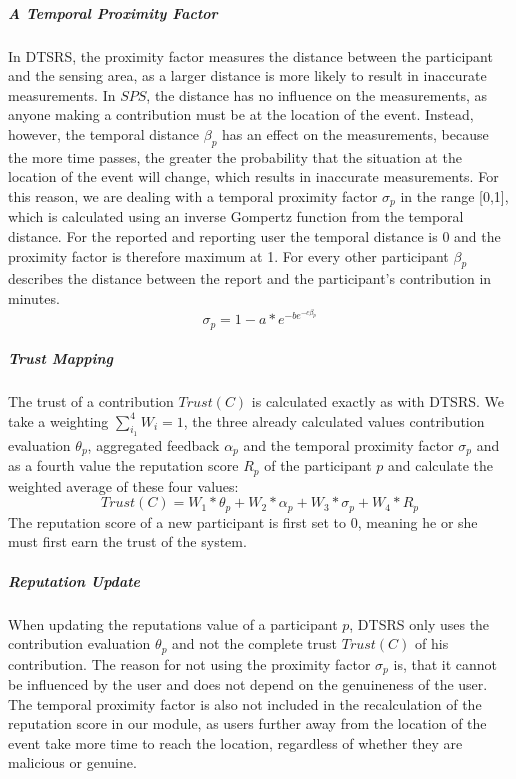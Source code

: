 \subparagraph{A Temporal Proximity Factor} In DTSRS, the proximity factor measures the distance between the participant and the sensing area, as a larger distance is more likely to result in inaccurate measurements. In $SPS$, the distance has no influence on the measurements, as anyone making a contribution must be at the location of the event. Instead, however, the temporal distance $\beta_p$ has an effect on the measurements, because the more time passes, the greater the probability that the situation at the location of the event will change, which results in inaccurate measurements. For this reason, we are dealing with a temporal proximity factor $\sigma_p$ in the range [0,1], which is calculated using an inverse Gompertz function from the temporal distance. For the reported and reporting user the temporal distance is 0 and the proximity factor is therefore maximum at 1. For every other participant $\beta_p$ describes the distance between the report and the participant's contribution in minutes.
\begin{equation}
  \sigma_p = 1 - a * e^{-be^{-c\beta_p}}
\end{equation}

\subparagraph{Trust Mapping} The trust of a contribution $Trust(C)$ is calculated exactly as with DTSRS. We take a weighting $\sum_{i_1}^{4} W_i = 1$, the three already calculated values contribution evaluation $\theta_p$, aggregated feedback $\alpha_p$ and the temporal proximity factor $\sigma_p$ and as a fourth value the reputation score $R_p$ of the participant $p$ and calculate the weighted average of these four values:
\begin{equation}
  Trust(C) = W_1 * \theta_p +W_2 *  \alpha_p +W_3 *  \sigma_p +W_4 *  R_p
\end{equation}
The reputation score of a new participant is first set to 0, meaning he or she must first earn the trust of the system.

\subparagraph{Reputation Update} When updating the reputations value of a participant $p$, DTSRS only uses the contribution evaluation $\theta_p$ and not the complete trust $Trust(C)$ of his contribution. The reason for not using the proximity factor $\sigma_p$ is, that it cannot be influenced by the user and does not depend on the genuineness of the user. The temporal proximity factor is also not included in the recalculation of the reputation score in our module, as users further away from the location of the event take more time to reach the location, regardless of whether they are malicious or genuine.

